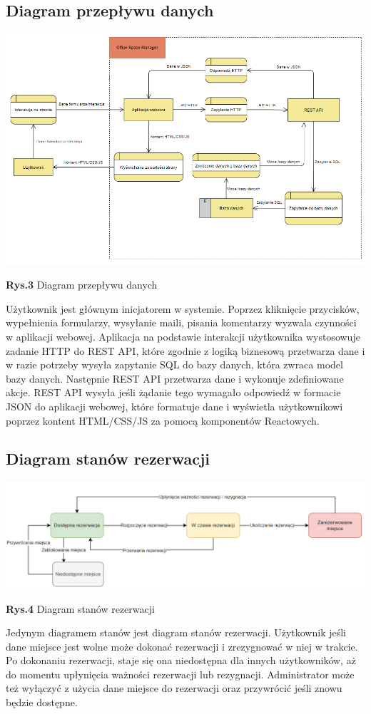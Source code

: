 \documentclass{article}
\begin{document}
\subsection{Diagram przepływu danych}
\hspace*{-3.5cm}\includegraphics[scale=0.7]{dfd_diagram}
\begin{center}\textbf{Rys.3} Diagram przepływu danych \end{center}
Użytkownik jest głównym inicjatorem w systemie. Poprzez kliknięcie przycisków, wypełnienia formularzy, wysyłanie maili, pisania komentarzy wyzwala czynności w aplikacji webowej. Aplikacja na podstawie interakcji użytkownika wystosowuje zadanie HTTP do REST API, które zgodnie z logiką biznesową przetwarza dane i w razie potrzeby wysyła zapytanie SQL do bazy danych, która zwraca model bazy danych. Następnie REST API przetwarza dane i wykonuje zdefiniowane akcje. REST API wysyła jeśli żądanie tego wymagało odpowiedź w formacie JSON do aplikacji webowej, które formatuje dane i wyświetla użytkownikowi poprzez kontent HTML/CSS/JS za pomocą komponentów Reactowych.

\subsection{Diagram stanów rezerwacji}
\hspace*{-4cm}\includegraphics[scale=0.55]{state_diagram}
\begin{center}\textbf{Rys.4} Diagram stanów rezerwacji \end{center}
Jedynym diagramem stanów jest diagram stanów rezerwacji. Użytkownik jeśli dane miejsce jest wolne może dokonać rezerwacji i zrezygnować w niej w trakcie. Po dokonaniu rezerwacji, staje się ona niedostępna dla innych użytkowników, aż do momentu upłynięcia ważności rezerwacji lub rezygnacji. Administrator może też wyłączyć z użycia dane miejsce do rezerwacji oraz przywrócić jeśli znowu będzie dostępne.
\end{document}
